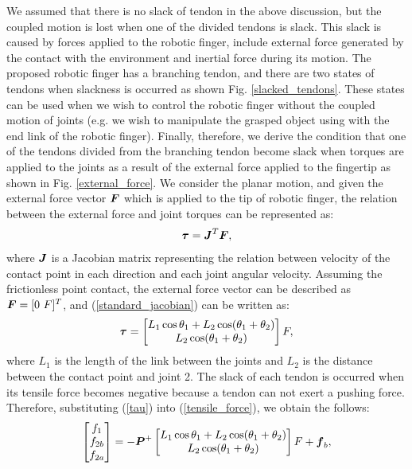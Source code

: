 \documentclass{llncs}
\def\vect#1{\mbox{\boldmath$#1$}}
\begin{document}
We assumed that there is no slack of tendon in the above discussion, but the coupled motion is lost when one of the divided tendons is slack.
This slack is caused by forces applied to the robotic finger, include external force generated by the contact with the environment and inertial force during its motion.
The proposed robotic finger has a branching tendon, and there are two states of tendons when slackness is occurred as shown Fig. \ref{slacked_tendons}.
These states can be used when we wish to control the robotic finger without the coupled motion of joints (e.g. we wish to manipulate the grasped object using with the end link of the robotic finger).
Finally, therefore, we derive the condition that one of the tendons divided from the branching tendon become slack when torques are applied to the joints as a result of the external force applied to the fingertip as shown in Fig. \ref{external_force}.
We consider the planar motion, and given the external force vector $\vect{F}$ which is applied to the tip of robotic finger, the relation between the external force and joint torques can be represented as:
\begin{align}
	\vect{\tau}=\vect{J}^{T}\vect{F},
\label{standard_jacobian}
\end{align}
where $\vect{J}$ is a Jacobian matrix representing the relation between velocity of the contact point in each direction and each joint angular velocity.
Assuming the frictionless point contact, the external force vector can be described as $\vect{F}=[0\ F]^{T}$, and (\ref{standard_jacobian}) can be written as:
\begin{align}
	\vect{\tau}=
		\begin{bmatrix}
	L_{1}\cos\theta_{1}+L_{2}\cos(\theta_{1}+\theta_{2})\\
	L_{2}\cos(\theta_{1}+\theta_{2})
		\end{bmatrix}F,
\label{tau}
\end{align}
where $L_{1}$ is the length of the link between the joints and $L_{2}$ is the distance between the contact point and joint 2.
The slack of each tendon is occurred when its tensile force becomes negative because a tendon can not exert a pushing force.
Therefore, substituting (\ref{tau}) into (\ref{tensile_force}), we obtain the follows:
\begin{align}
	\begin{bmatrix}
	f_{1}\\
	f_{2b}\\
	f_{2a}
		\end{bmatrix}
	=-\vect{P}^{+}
		\begin{bmatrix}
	L_{1}\cos\theta_{1}+L_{2}\cos(\theta_{1}+\theta_{2})\\
	L_{2}\cos(\theta_{1}+\theta_{2})
		\end{bmatrix}
	F+\vect{f}_{b},	\label{eq:f-tau-pinv}
\end{align}
\end{document}
